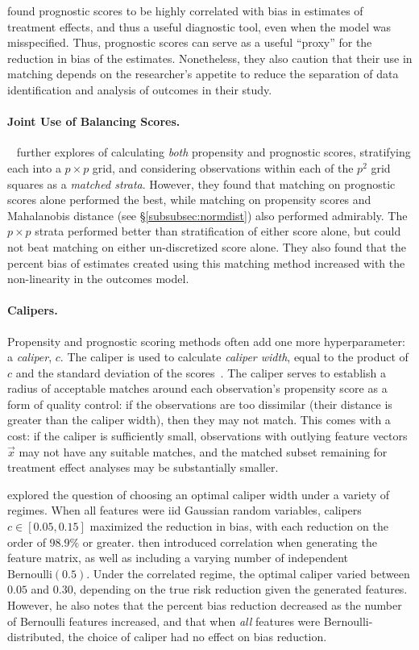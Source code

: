 \documentclass[11pt]{extarticle}
\begin{document}
\textcite{stuart_prognostic_2013} found prognostic scores to be highly correlated with bias in estimates of treatment effects, and thus a useful diagnostic tool, even when the model was misspecified. Thus, prognostic scores can serve as a useful ``proxy'' for the reduction in bias of the estimates. Nonetheless, they also caution that their use in matching depends on the researcher's appetite to reduce the separation of data identification and analysis of outcomes in their study.

\paragraph{Joint Use of Balancing Scores.}~\textcite{leacy_joint_2014} further explores of calculating \emph{both} propensity and prognostic scores, stratifying each into a $p \times p$ grid, and considering observations within each of the $p^2$ grid squares as a \emph{matched strata}. However, they found that matching on prognostic scores alone performed the best, while matching on propensity scores and Mahalanobis distance (see \S\ref{subsubsec:normdist}) also performed admirably. The $p \times p$ strata performed better than stratification of either score alone, but could not beat matching on either un-discretized score alone. They also found that the percent bias of estimates created using this matching method increased with the non-linearity in the outcomes model.

\paragraph{Calipers.} Propensity and prognostic scoring methods often add one more hyperparameter: a \emph{caliper}, $c$. The caliper is used to calculate \emph{caliper width}, equal to the product of $c$ and the standard deviation of the scores~\parencite{ho_matchit_2011}.
The caliper serves to establish a radius of acceptable matches around each observation's propensity score as a form of quality control: if the observations are too dissimilar (their distance is greater than the caliper width), then they may not match.
This comes with a cost: if the caliper is sufficiently small, observations with outlying feature vectors $\vec{x}$ may not have any suitable matches, and the matched subset remaining for treatment effect analyses may be substantially smaller.

\textcite{austin_optimal_2011} explored the question of choosing an optimal caliper width under a variety of regimes. When all features were iid Gaussian random variables, calipers $c \in [0.05, 0.15]$ maximized the reduction in bias, with each reduction on the order of $98.9\%$ or greater. \citeauthor{austin_optimal_2011} then introduced correlation when generating the feature matrix, as well as including a varying number of independent $\text{Bernoulli}(0.5)$. Under the correlated regime, the optimal caliper varied between $0.05$ and $0.30$, depending on the true risk reduction given the generated features. However, he also notes that the percent bias reduction decreased as the number of Bernoulli features increased, and that when \emph{all} features were Bernoulli-distributed, the choice of caliper had no effect on bias reduction.
\end{document}
